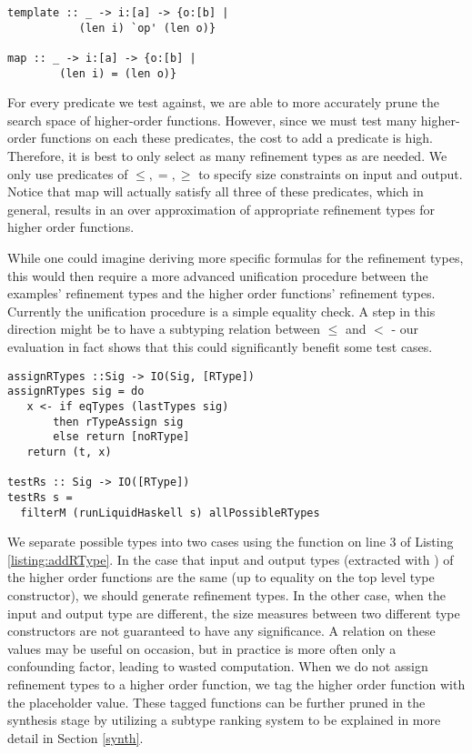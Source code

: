 \begin{lstlisting}[numbers=none]
template :: _ -> i:[a] -> {o:[b] |
           (len i) `op' (len o)}
        
map :: _ -> i:[a] -> {o:[b] |
        (len i) = (len o)}
\end{lstlisting}


For every predicate  we test against, we are able to more accurately prune the search space of higher-order functions.
However, since we must test many higher-order functions on each these predicates, the cost to add a predicate is high.
Therefore, it is best to only select as many refinement types as are needed.
We only use predicates of $\leq,=,\geq$ to specify size constraints on input and output.
Notice that map will actually satisfy all three of these predicates, which in general, results in an over approximation of appropriate refinement types for higher order functions.

While one could imagine deriving more specific formulas for the refinement types, this would then require a more advanced unification procedure between the examples' refinement types and the higher order functions' refinement types.
Currently the unification procedure is a simple equality check.
A step in this direction might be to have a subtyping relation between $\leq$ and $<$ - our evaluation in fact shows that this could significantly benefit some test cases.


\begin{lstlisting}[caption=Adding refinement types to higher order functions,label=listing:addRType]
assignRTypes ::Sig -> IO(Sig, [RType])
assignRTypes sig = do
   x <- if eqTypes (lastTypes sig) 
       then rTypeAssign sig
       else return [noRType]
   return (t, x)

testRs :: Sig -> IO([RType])
testRs s =
  filterM (runLiquidHaskell s) allPossibleRTypes
\end{lstlisting}

We separate possible types into two cases using the  function on line 3 of Listing \ref{listing:addRType}.
In the case that input and output types (extracted with ) of the higher order functions are the same (up to equality on the top level type constructor), we should generate refinement types.
In the other case, when the input and output type are different, the size measures between two different type constructors are not guaranteed to have any significance.
A relation on these values may be useful on occasion, but in practice is more often only a confounding factor, leading to wasted computation.
When we do not assign refinement types to a higher order function, we tag the higher order function with the placeholder  value.
These  tagged functions can be further pruned in the synthesis stage by utilizing a subtype ranking system to be explained in more detail in Section \ref{synth}.

